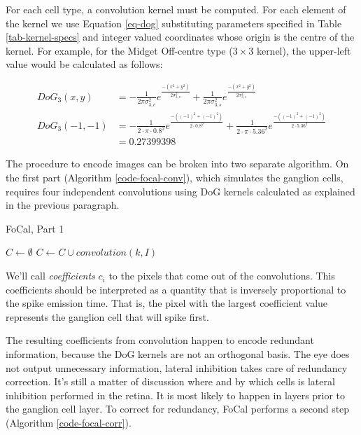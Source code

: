 For each cell type, a convolution kernel must be computed. For each element of the kernel we use Equation \ref{eq-dog} substituting parameters specified in Table \ref{tab-kernel-specs} and integer valued coordinates whose origin is the centre of the kernel. For example, for the Midget Off-centre type ($3\times3$ kernel), the upper-left value would be calculated as follows:

\begin{align}
\label{eq-dog-3x3}
DoG_3(x,y) &= -\frac{1}{2\pi\sigma_{3,c}^2}e^{\frac{-(x^2 + y^2)}{2\sigma_{3,c}^2}}
+ \frac{1}{2\pi\sigma_{3,s}^2}e^{\frac{-(x^2 + y^2)}{2\sigma_{3,s}^2}} \\
DoG_3(-1,-1) &= -\frac{1}{2\cdot\pi\cdot 0.8^2}e^{\frac{-((-1)^2 + (-1)^2)}{2\cdot 0.8^2}}
+ \frac{1}{2\cdot\pi\cdot 5.36^2}e^{\frac{-((-1)^2 + (-1)^2)}{2\cdot 5.36^2}} \nonumber \\[0.5em]
             &= 0.27399398 \nonumber
\end{align}

The procedure to encode images can be broken into two separate algorithm. On the first part (Algorithm \ref{code-focal-conv}), which simulates the ganglion cells, requires four independent convolutions using DoG kernels calculated as explained in the previous paragraph. 

\begin{algorithm}[h]
  \caption{FoCal, Part 1}
  \label{code-focal-conv}
  \begin{algorithmic}
    \State $C \leftarrow \emptyset$
    \State $C \leftarrow C \cup convolution(k, I)$
    \EndFor
    \EndProcedure
  \end{algorithmic}
\end{algorithm}

We'll call \emph{coefficients} $c_{i}$ to the pixels that come out of the convolutions. This coefficients should be interpreted as a quantity that is inversely proportional to the spike emission time. That is, the pixel with the largest coefficient value represents the ganglion cell that will spike first. 

The resulting coefficients from convolution happen to encode redundant information, because the DoG kernels are not an orthogonal basis. The eye does not output unnecessary information, lateral inhibition takes care of redundancy correction. It's still a matter of discussion where and by which cells is lateral inhibition performed in the retina. It is most likely to happen in layers prior to the ganglion cell layer. To correct for redundancy, FoCal performs a second step (Algorithm \ref{code-focal-corr}).

